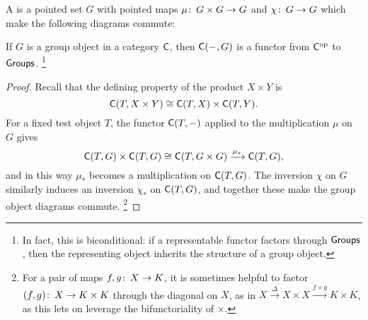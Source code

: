 \begin{definition}
A  is a pointed set $G$ with pointed maps $\mu\colon\thinspace G \times G \to G$ and $\chi\colon\thinspace G \to G$ which make the following diagrams commute:
\begin{center}
\end{center}
\end{definition}

\begin{lemma}
If $G$ is a group object in a category $\mathsf{C}$, then $\mathsf{C}(-, G)$ is a functor from $\mathsf{C}^{\mathrm{op}}$ to $\mathsf{Groups}$.
\footnote{In fact, this is biconditional: if a representable functor factors through $\mathsf{Groups}$, then the representing object inherits the structure of a group object.}
\end{lemma}
\begin{proof}
Recall that the defining property of the product $X \times Y$ is \[\mathsf{C}(T, X \times Y) \cong \mathsf{C}(T, X) \times \mathsf{C}(T, Y).\]
For a fixed test object $T$, the functor $\mathsf{C}(T, -)$ applied to the multiplication $\mu$ on $G$ gives \[\mathsf{C}(T, G) \times \mathsf{C}(T, G) \cong \mathsf{C}(T, G \times G) \xrightarrow{\mu_*} \mathsf{C}(T, G),\] and in this way $\mu_*$ becomes a multiplication on $\mathsf{C}(T, G)$.
The inversion $\chi$ on $G$ similarly induces an inversion $\chi_*$ on $\mathsf{C}(T, G)$, and together these make the group object diagrams commute.
\footnote{For a pair of maps $f, g\colon\thinspace X \to K$, it is sometimes helpful to factor $(f, g)\colon\thinspace X \to K \times K$ through the diagonal on $X$, as in $X \xrightarrow\Delta X \times X \xrightarrow{f \times g} K \times K$, as this lets on leverage the bifunctoriality of $\times$.}
\end{proof}

